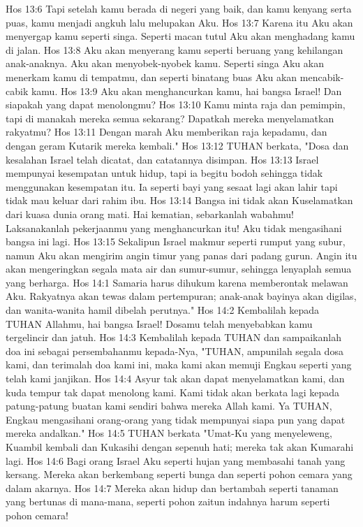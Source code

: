 Hos 13:6  Tapi setelah kamu berada di negeri yang baik, dan kamu kenyang serta puas, kamu menjadi angkuh lalu melupakan Aku.
Hos 13:7  Karena itu Aku akan menyergap kamu seperti singa. Seperti macan tutul Aku akan menghadang kamu di jalan.
Hos 13:8  Aku akan menyerang kamu seperti beruang yang kehilangan anak-anaknya. Aku akan menyobek-nyobek kamu. Seperti singa Aku akan menerkam kamu di tempatmu, dan seperti binatang buas Aku akan mencabik-cabik kamu.
Hos 13:9  Aku akan menghancurkan kamu, hai bangsa Israel! Dan siapakah yang dapat menolongmu?
Hos 13:10  Kamu minta raja dan pemimpin, tapi di manakah mereka semua sekarang? Dapatkah mereka menyelamatkan rakyatmu?
Hos 13:11  Dengan marah Aku memberikan raja kepadamu, dan dengan geram Kutarik mereka kembali."
Hos 13:12  TUHAN berkata, "Dosa dan kesalahan Israel telah dicatat, dan catatannya disimpan.
Hos 13:13  Israel mempunyai kesempatan untuk hidup, tapi ia begitu bodoh sehingga tidak menggunakan kesempatan itu. Ia seperti bayi yang sesaat lagi akan lahir tapi tidak mau keluar dari rahim ibu.
Hos 13:14  Bangsa ini tidak akan Kuselamatkan dari kuasa dunia orang mati. Hai kematian, sebarkanlah wabahmu! Laksanakanlah pekerjaanmu yang menghancurkan itu! Aku tidak mengasihani bangsa ini lagi.
Hos 13:15  Sekalipun Israel makmur seperti rumput yang subur, namun Aku akan mengirim angin timur yang panas dari padang gurun. Angin itu akan mengeringkan segala mata air dan sumur-sumur, sehingga lenyaplah semua yang berharga.
Hos 14:1  Samaria harus dihukum karena memberontak melawan Aku. Rakyatnya akan tewas dalam pertempuran; anak-anak bayinya akan digilas, dan wanita-wanita hamil dibelah perutnya."
Hos 14:2  Kembalilah kepada TUHAN Allahmu, hai bangsa Israel! Dosamu telah menyebabkan kamu tergelincir dan jatuh.
Hos 14:3  Kembalilah kepada TUHAN dan sampaikanlah doa ini sebagai persembahanmu kepada-Nya, "TUHAN, ampunilah segala dosa kami, dan terimalah doa kami ini, maka kami akan memuji Engkau seperti yang telah kami janjikan.
Hos 14:4  Asyur tak akan dapat menyelamatkan kami, dan kuda tempur tak dapat menolong kami. Kami tidak akan berkata lagi kepada patung-patung buatan kami sendiri bahwa mereka Allah kami. Ya TUHAN, Engkau mengasihani orang-orang yang tidak mempunyai siapa pun yang dapat mereka andalkan."
Hos 14:5  TUHAN berkata "Umat-Ku yang menyeleweng, Kuambil kembali dan Kukasihi dengan sepenuh hati; mereka tak akan Kumarahi lagi.
Hos 14:6  Bagi orang Israel Aku seperti hujan yang membasahi tanah yang kersang. Mereka akan berkembang seperti bunga dan seperti pohon cemara yang dalam akarnya.
Hos 14:7  Mereka akan hidup dan bertambah seperti tanaman yang bertunas di mana-mana, seperti pohon zaitun indahnya harum seperti pohon cemara!
